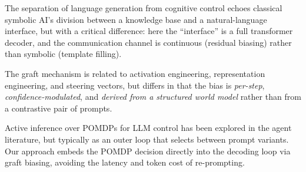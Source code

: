 The separation of language generation from cognitive control echoes classical
symbolic AI's division between a knowledge base and a natural-language
interface, but with a critical difference: here the ``interface'' is a full
transformer decoder, and the communication channel is continuous (residual
biasing) rather than symbolic (template filling).

The graft mechanism is related to activation engineering, representation
engineering, and steering vectors, but differs in that the bias is
\emph{per-step}, \emph{confidence-modulated}, and \emph{derived from a
structured world model} rather than from a contrastive pair of prompts.

Active inference over POMDPs for LLM control has been explored in the agent
literature, but typically as an outer loop that selects between prompt variants.
Our approach embeds the POMDP decision directly into the decoding loop via
graft biasing, avoiding the latency and token cost of re-prompting.

